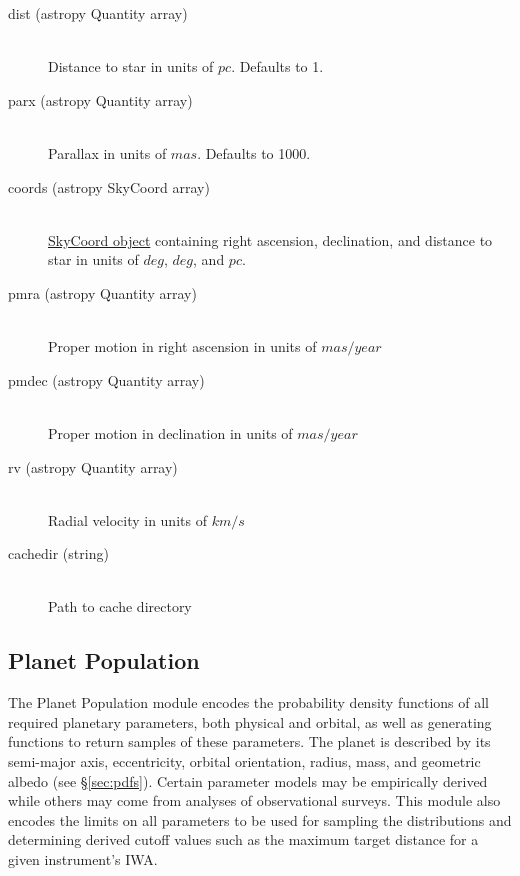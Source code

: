 \documentclass[cleanfoot]{asme2ej}
\begin{document}
\begin{itemize}
\begin{description}
    \item[dist (astropy Quantity array)] \hfill \\ Distance to star in units of $ pc $. Defaults to 1.
    \item[parx (astropy Quantity array)] \hfill \\ Parallax in units of $ mas $. Defaults to 1000.
    \item[coords (astropy SkyCoord array)] \hfill \\ \href{http://astropy.readthedocs.org/en/latest/api/astropy.coordinates.SkyCoord.html}{SkyCoord object} containing right ascension, declination, and distance to star in units of $ deg $, $ deg $, and $ pc $.
    \item[pmra (astropy Quantity array)] \hfill \\ Proper motion in right ascension in units of $ mas/year $
    \item[pmdec (astropy Quantity array)] \hfill \\ Proper motion in declination in units of $ mas/year $
    \item[rv (astropy Quantity array)] \hfill \\ Radial velocity in units of $ km/s $
    \item[cachedir (string)] \hfill \\ Path to cache directory
\end{description}
\end{itemize}



\subsection{Planet Population}
The Planet Population module encodes the probability density functions of all required planetary parameters, both physical and orbital, as well as generating functions to return samples of these parameters. The planet is described by its semi-major axis, eccentricity, orbital orientation, radius, mass, and geometric albedo (see \S\ref{sec:pdfs}). Certain parameter models may be empirically derived while others may come from analyses of observational surveys.  This module also encodes the limits on all parameters to be used for sampling the distributions and determining derived cutoff values such as the maximum target distance for a given instrument's IWA.
\end{document}
